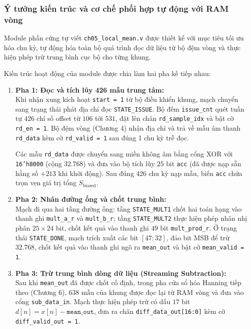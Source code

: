 \subsubsection*{Ý tưởng kiến trúc và cơ chế phối hợp tự động với RAM vòng}
Module phần cứng tự viết \texttt{ch05\_local\_mean.v} được thiết kế với mục tiêu tối ưu hóa chu kỳ, tự động hóa toàn bộ quá trình đọc dữ liệu từ bộ đệm vòng và thực hiện phép trừ trung bình cục bộ cho từng khung. 

Kiến trúc hoạt động của module được chia làm hai pha kế tiếp nhau:
\begin{enumerate}[leftmargin=1.5em, itemsep=2pt]
    \item \textbf{Pha 1: Đọc và tích lũy 426 mẫu trung tâm:}\\
    Khi nhận xung kích hoạt \texttt{start = 1} từ bộ điều khiển khung, mạch chuyển sang trạng thái phát địa chỉ đọc \texttt{STATE\_ISSUE}. Bộ đếm \texttt{issue\_cnt} quét tuần tự $426$ chỉ số offset từ $106$ tới $531$, đặt lên chân \texttt{rd\_sample\_idx} và bật cờ \texttt{rd\_en = 1}. Bộ đệm vòng (Chương 4) nhận địa chỉ và trả về mẫu âm thanh \texttt{rd\_data} kèm cờ \texttt{rd\_valid = 1} sau đúng 1 chu kỳ trễ đọc.
    
    Các mẫu \texttt{rd\_data} được chuyển sang miền không âm bằng cổng XOR với \texttt{16'h8000} (cộng $32.768$) và đưa vào bộ tích lũy $25\text{ bit}$ \texttt{acc} (đã được nạp sẵn hằng số $+213$ khi khởi động). Sau đúng 426 chu kỳ nạp mẫu, biến \texttt{acc} chứa trọn vẹn giá trị tổng $S_{\text{biased}}$.
    
    \item \textbf{Pha 2: Nhân đường ống và chốt trung bình:}\\
    Mạch đi qua hai tầng đường ống: tầng \texttt{STATE\_MULT1} chốt hai toán hạng vào thanh ghi \texttt{mult\_a\_r} và \texttt{mult\_b\_r}; tầng \texttt{STATE\_MULT2} thực hiện phép nhân nhị phân $25 \times 24\text{ bit}$, chốt kết quả vào thanh ghi $49\text{ bit}$ \texttt{mult\_prod\_r}. Ở trạng thái \texttt{STATE\_DONE}, mạch trích xuất các bit $[47:32]$, đảo bit MSB để trừ $32.768$, chốt kết quả vào thanh ghi ngõ ra \texttt{mean\_out} và bật cờ \texttt{mean\_valid = 1}.
    
    \item \textbf{Pha 3: Trừ trung bình dòng dữ liệu (Streaming Subtraction):}\\
    Sau khi \texttt{mean\_out} đã được chốt cố định, trong pha cửa sổ hóa Hanning tiếp theo (Chương 6), $638\text{ mẫu}$ của khung được đọc lại từ RAM vòng và đưa vào cổng \texttt{sub\_data\_in}. Mạch thực hiện phép trừ có dấu $17\text{ bit}$ $d[n] = x[n] - \texttt{mean\_out}$, đưa ra chân \texttt{diff\_data\_out[16:0]} kèm cờ \texttt{diff\_valid\_out = 1}.
\end{enumerate}

